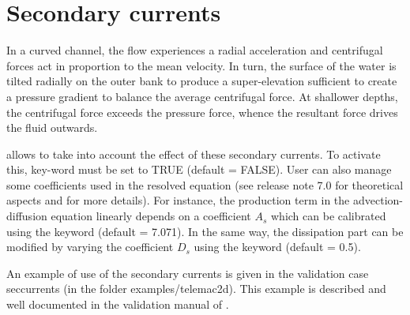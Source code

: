 \chapter{Secondary currents}
\label{ch:sec:curr}
In a curved channel, the flow experiences a radial acceleration and centrifugal
forces act in proportion to the mean velocity.
In turn, the surface of the water is tilted radially on the outer bank
to produce a super-elevation sufficient to create a pressure gradient 
to balance the average centrifugal force.
At shallower depths, the centrifugal force exceeds the pressure force,
whence the resultant force drives the fluid outwards.

 allows to take into account the effect of these secondary currents.
To activate this, key-word  must be set to TRUE
(default = FALSE).
User can also manage some coefficients used in the resolved equation
(see release note 7.0 for theoretical aspects and for more details).
For instance, the production term in the advection-diffusion equation linearly
depends on a coefficient $A_s$ which can be calibrated using the keyword
 (default = 7.071).
In the same way, the dissipation part can be modified by varying
the coefficient $D_{s}$ using the keyword
 (default = 0.5).

An example of use of the secondary currents is given in the validation case
seccurrents (in the folder examples/telemac2d). 
This example is described and well documented in the validation manual of
.
